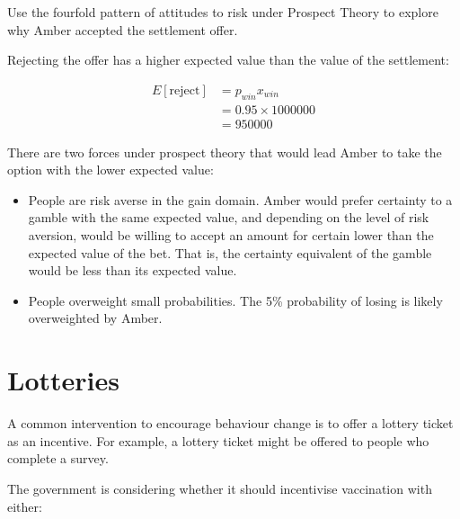 \documentclass[
  letterpaper,
  DIV=11,
  numbers=noendperiod]{scrreprt}
\providecommand{\tightlist}{%
  \setlength{\itemsep}{0pt}\setlength{\parskip}{0pt}}\usepackage{longtable,booktabs,array}
\begin{document}
Use the fourfold pattern of attitudes to risk under Prospect Theory to
explore why Amber accepted the settlement offer.

\begin{tcolorbox}[enhanced jigsaw, title=\textcolor{quarto-callout-tip-color}{\faLightbulb}\hspace{0.5em}{Answer}, toprule=.15mm, colback=white, breakable, titlerule=0mm, colframe=quarto-callout-tip-color-frame, coltitle=black, opacityback=0, rightrule=.15mm, colbacktitle=quarto-callout-tip-color!10!white, bottomtitle=1mm, opacitybacktitle=0.6, arc=.35mm, bottomrule=.15mm, toptitle=1mm, leftrule=.75mm, left=2mm]

Rejecting the offer has a higher expected value than the value of the
settlement:

\begin{align*}
E[\text{reject}]&=p_{win} x_{win} \\
&=0.95\times 1000000 \\
&=950000
\end{align*}

There are two forces under prospect theory that would lead Amber to take
the option with the lower expected value:

\begin{itemize}
\tightlist
\item
  People are risk averse in the gain domain. Amber would prefer
  certainty to a gamble with the same expected value, and depending on
  the level of risk aversion, would be willing to accept an amount for
  certain lower than the expected value of the bet. That is, the
  certainty equivalent of the gamble would be less than its expected
  value.
\item
  People overweight small probabilities. The 5\% probability of losing
  is likely overweighted by Amber.
\end{itemize}

\end{tcolorbox}

\hypertarget{lotteries}{%
\section{Lotteries}\label{lotteries}}

A common intervention to encourage behaviour change is to offer a
lottery ticket as an incentive. For example, a lottery ticket might be
offered to people who complete a survey.

The government is considering whether it should incentivise vaccination
with either:
\end{document}
